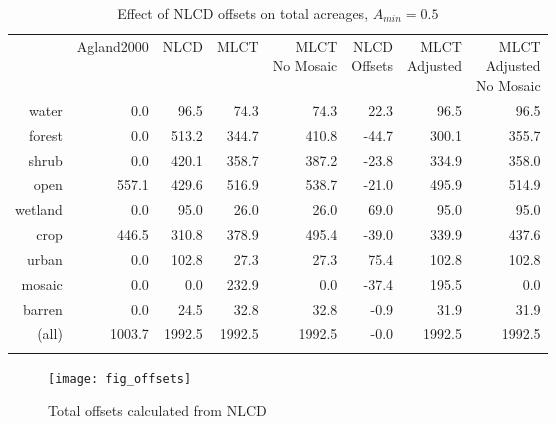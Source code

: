 \begin{table}[ht]
\begin{center}
{\small
\begin{tabular}{rrrrrrrr}
  \hline
 & Agland2000 & NLCD & MLCT & \pbox[c][][c]{3in}{MLCT\\No Mosaic} & \pbox[c][][c]{3in}{NLCD\\Offsets} & \pbox[c][][c]{3in}{MLCT\\Adjusted} & \pbox[c][][c]{3in}{\smallskip{}MLCT\\Adjusted\\No Mosaic} \\ 
  \noalign{\smallskip} \hline
water & 0.0 & 96.5 & 74.3 & 74.3 & 22.3 & 96.5 & 96.5 \\ 
  forest & 0.0 & 513.2 & 344.7 & 410.8 & -44.7 & 300.1 & 355.7 \\ 
  shrub & 0.0 & 420.1 & 358.7 & 387.2 & -23.8 & 334.9 & 358.0 \\ 
  open & 557.1 & 429.6 & 516.9 & 538.7 & -21.0 & 495.9 & 514.9 \\ 
  wetland & 0.0 & 95.0 & 26.0 & 26.0 & 69.0 & 95.0 & 95.0 \\ 
  crop & 446.5 & 310.8 & 378.9 & 495.4 & -39.0 & 339.9 & 437.6 \\ 
  urban & 0.0 & 102.8 & 27.3 & 27.3 & 75.4 & 102.8 & 102.8 \\ 
  mosaic & 0.0 & 0.0 & 232.9 & 0.0 & -37.4 & 195.5 & 0.0 \\ 
  barren & 0.0 & 24.5 & 32.8 & 32.8 & -0.9 & 31.9 & 31.9 \\ 
  (all) & 1003.7 & 1992.5 & 1992.5 & 1992.5 & -0.0 & 1992.5 & 1992.5 \\ 
   \noalign{\smallskip} \hline
\end{tabular}
}
\caption{Effect of NLCD offsets on total acreages, $A_{min}=0.5$}
\label{tab:areas2}
\end{center}
\end{table}

\begin{figure}[ht]
  \centering


  \texttt{[image: fig\_offsets]}
  \caption{Total offsets calculated from NLCD}
  \label{fig:offsets}
\end{figure}


